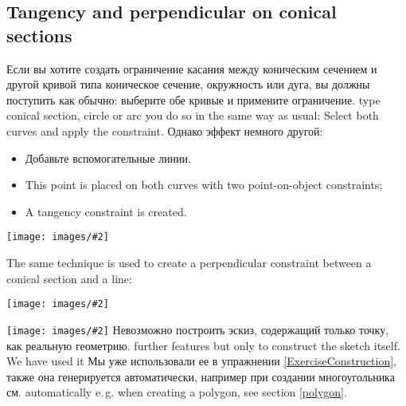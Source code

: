 \documentclass[12pt,titlepage]{article}
\newcommand{\img}[2]{\vspace{2ex}\noindent\texttt{[image: images/\#2]}}
\begin{document}
\begin {itemize}
\begin {itemize}
\subsection{Tangency and perpendicular on conical sections}
\label {Point}
Если вы хотите создать ограничение касания между коническим сечением и другой кривой типа коническое сечение, окружность или дуга, вы должны поступить как обычно: выберите обе кривые и примените ограничение.
type conical section, circle or arc you do so in the same way as usual: Select both curves and
apply the constraint. Однако эффект немного другой:

\begin{itemize}
\item Добавьте вспомогательные линии.
\item This point is placed on both curves with two point-on-object constraints;
\item A tangency constraint is created.
\end{itemize}

\img{scale=1}{ConicalTangent}

The same technique is used to create a perpendicular constraint between a conical section and
a line:

\img{scale=1}{ConicalPerpendicular}

\img {scale = 1} {ConstructionListOfElements}
\label{ConstructionGeometry}
\vbox{
Невозможно построить эскиз, содержащий только точку, как реальную геометрию.
further features but only to construct the sketch itself. We have used it
Мы  уже использовали ее в упражнении \vref {ExerciseConstruction}, также она генерируется автоматически, например при создании многоугольника см.
automatically e.\,g. when creating a polygon, see section \vref{polygon}.
}


\end{itemize}
\end{itemize}
\end{document}
